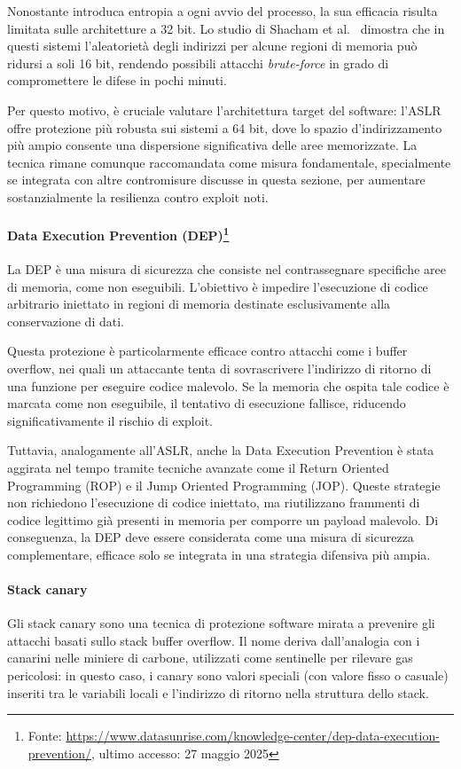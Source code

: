 Nonostante introduca entropia a ogni avvio del processo, la sua efficacia
risulta limitata sulle architetture a 32 bit. Lo studio di Shacham et al.~\cite{aslr_effectiveness}
dimostra che in questi sistemi l'aleatorietà degli indirizzi per alcune regioni
di memoria può ridursi a soli 16 bit, rendendo possibili attacchi \textit{brute-force}
in grado di compromettere le difese in pochi minuti.

Per questo motivo, è cruciale valutare l'architettura target del software: l'ASLR
offre protezione più robusta sui sistemi a 64 bit, dove lo spazio d'indirizzamento
più ampio consente una dispersione significativa delle aree memorizzate. La
tecnica rimane comunque raccomandata come misura fondamentale, specialmente se integrata
con altre contromisure discusse in questa sezione, per aumentare sostanzialmente
la resilienza contro exploit noti.

\paragraph{Data Execution Prevention (DEP)\protect\footnote{Fonte: \url{https://www.datasunrise.com/knowledge-center/dep-data-execution-prevention/},
ultimo accesso: 27 maggio 2025}}
La DEP è una misura di sicurezza che consiste nel contrassegnare specifiche aree
di memoria, come non eseguibili. L'obiettivo è impedire l'esecuzione di codice arbitrario
iniettato in regioni di memoria destinate esclusivamente alla conservazione di dati.

Questa protezione è particolarmente efficace contro attacchi come i buffer overflow,
nei quali un attaccante tenta di sovrascrivere l'indirizzo di ritorno di una
funzione per eseguire codice malevolo. Se la memoria che ospita tale codice è marcata
come non eseguibile, il tentativo di esecuzione fallisce, riducendo significativamente
il rischio di exploit.

Tuttavia, analogamente all'ASLR, anche la Data Execution Prevention è stata aggirata
nel tempo tramite tecniche avanzate come il Return Oriented Programming (ROP) e il
Jump Oriented Programming (JOP). Queste strategie non richiedono l'esecuzione di
codice iniettato, ma riutilizzano frammenti di codice legittimo già presenti in memoria
per comporre un payload malevolo. Di conseguenza, la DEP deve essere considerata
come una misura di sicurezza complementare, efficace solo se integrata in una
strategia difensiva più ampia.

\paragraph{Stack canary}
Gli stack canary sono una tecnica di protezione software mirata a prevenire gli attacchi
basati sullo stack buffer overflow. Il nome deriva dall'analogia con i canarini
nelle miniere di carbone, utilizzati come sentinelle per rilevare gas pericolosi:
in questo caso, i canary sono valori speciali (con valore fisso o casuale) inseriti
tra le variabili locali e l'indirizzo di ritorno nella struttura dello stack.

